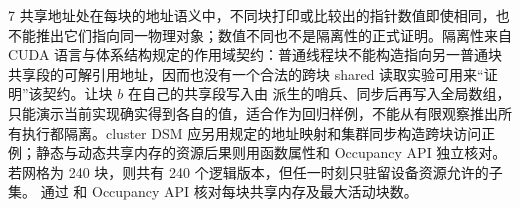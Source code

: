 \begin{solutionexercise}{7}
共享地址处在每块的地址语义中，不同块打印或比较出的指针数值即使相同，也不能推出它们指向同一物理对象；数值不同也不是隔离性的正式证明。隔离性来自 CUDA 语言与体系结构规定的作用域契约：普通线程块不能构造指向另一普通块共享段的可解引用地址，因而也没有一个合法的跨块 shared 读取实验可用来“证明”该契约。让块 $b$ 在自己的共享段写入由  派生的哨兵、同步后再写入全局数组，只能演示当前实现确实得到各自的值，适合作为回归样例，不能从有限观察推出所有执行都隔离。cluster DSM 应另用规定的地址映射和集群同步构造跨块访问正例；静态与动态共享内存的资源后果则用函数属性和 Occupancy API 独立核对。
\variantheading 若网格为 240 块，则共有 240 个逻辑版本，但任一时刻只驻留设备资源允许的子集。
\practiceheading 通过  和 Occupancy API 核对每块共享内存及最大活动块数。
\end{solutionexercise}

